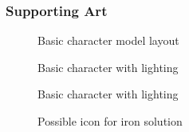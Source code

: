 \documentclass{article}
\begin{document}
\subsubsection{Supporting Art}
  \begin{figure}[!htb]
  \caption {Basic character model layout}
  \end{figure}

  \begin{figure}[!htb]
  \caption {Basic character with lighting}
  \end{figure}

  \begin{figure}[!htb]
  \caption {Basic character with lighting}
  \end{figure}

  \begin{figure}[!htb]
  \caption {Possible icon for iron solution}
  \end{figure}
\end{document}
